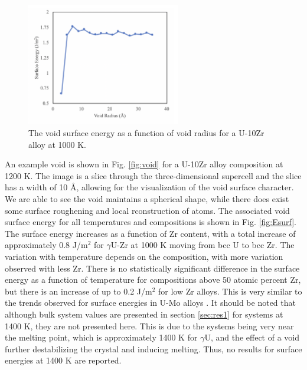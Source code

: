 \documentclass[review]{elsarticle}
\begin{document}
\begin{figure}[!htp]
\begin{center}
\includegraphics[width=0.6\textwidth]{6_size}
\end{center}
\caption{The void surface energy as a function of void radius for a U-10Zr alloy at 1000 K. }
\label{fig:size}
\end{figure}

An example void is shown in Fig. \ref{fig:void} for a U-10Zr alloy composition at 1200 K. The image is a slice through the three-dimensional supercell and the slice has a width of 10 \AA, allowing for the visualization of the void surface character. We are able to see the void maintains a spherical shape, while there does exist some surface roughening and local rconstruction of atoms. The associated void surface energy for all temperatures and compositions is shown in Fig. \ref{fig:Esurf}. The surface energy increases as a function of Zr content, with a total increase of approximately 0.8 J/m$^2$ for $\gamma$U-Zr at 1000 K moving from bcc U to bcc Zr. The variation with temperature depends on the composition, with more variation observed with less Zr. There is no statistically significant difference in the surface energy as a function of temperature for compositions above 50 atomic percent Zr, but there is an increase of up to 0.2 J/m$^2$ for low Zr alloys. This is very similar to the trends observed for surface energies in U-Mo alloys \cite{beelerumo}. It should be noted that although bulk system values are presented in section \ref{sec:res1} for systems at 1400 K, they are not presented here. This is due to the systems being very near the melting point, which is approximately 1400 K for $\gamma$U, and the effect of a void further destabilizing the crystal and inducing melting. Thus, no results for surface energies at 1400 K are reported. 
\end{document}
